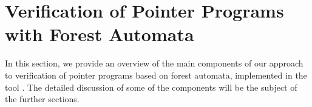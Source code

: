 
\section{Verification of Pointer Programs with Forest
Automata}\label{sec:verification}
In this section, we provide an overview of the main components of our approach to verification of pointer programs based on forest automata, implemented in the tool \forester. The detailed discussion of some of the components will be the subject of the further sections.

